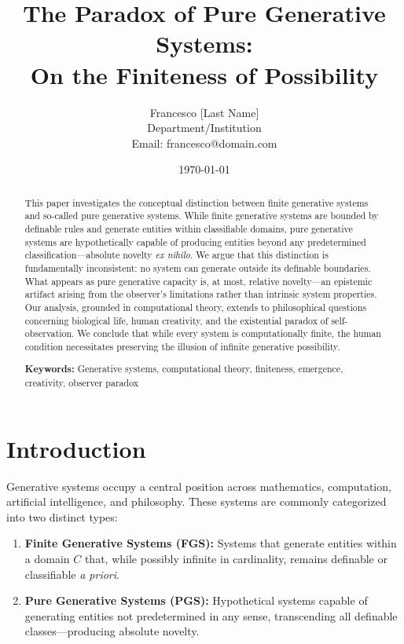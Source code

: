 \documentclass[11pt,a4paper]{article}
\title{The Paradox of Pure Generative Systems: \\
On the Finiteness of Possibility}
\author{Francesco [Last Name]\\
\small Department/Institution\\
\small Email: francesco@domain.com}
\date{\today}
\begin{document}
    \maketitle

    \begin{abstract}
        This paper investigates the conceptual distinction between finite generative systems and so-called pure generative systems. While finite generative systems are bounded by definable rules and generate entities within classifiable domains, pure generative systems are hypothetically capable of producing entities beyond any predetermined classification—absolute novelty \textit{ex nihilo}. We argue that this distinction is fundamentally inconsistent: no system can generate outside its definable boundaries. What appears as pure generative capacity is, at most, relative novelty—an epistemic artifact arising from the observer's limitations rather than intrinsic system properties. Our analysis, grounded in computational theory, extends to philosophical questions concerning biological life, human creativity, and the existential paradox of self-observation. We conclude that while every system is computationally finite, the human condition necessitates preserving the illusion of infinite generative possibility.

        \noindent\textbf{Keywords:} Generative systems, computational theory, finiteness, emergence, creativity, observer paradox
    \end{abstract}

    \section{Introduction}

    Generative systems occupy a central position across mathematics, computation, artificial intelligence, and philosophy. These systems are commonly categorized into two distinct types:

    \begin{enumerate}
        \item \textbf{Finite Generative Systems (FGS):} Systems that generate entities within a domain $C$ that, while possibly infinite in cardinality, remains definable or classifiable \textit{a priori}.

        \item \textbf{Pure Generative Systems (PGS):} Hypothetical systems capable of generating entities not predetermined in any sense, transcending all definable classes—producing absolute novelty.
    \end{enumerate}
\end{document}
